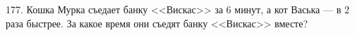 177. Кошка Мурка съедает банку <<Вискас>> за 6 минут, а кот Васька --- в 2 раза быстрее. За какое время они съедят банку <<Вискас>> вместе?\\
